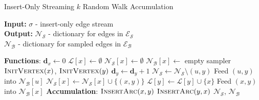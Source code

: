 \documentclass{report}
\newcommand{\algoname}[1]{\textnormal{\textsc{#1}}}
\begin{document}
\begin{algorithm}[htbp] 
\caption{Insert-Only Streaming $k$ Random Walk Accumulation}\label{alg:rw:serial:insert-only:accumulation}
\begin{flushleft}
        \textbf{Input:} 		$\sigma$ - insert-only edge stream\\
        \textbf{Output:} $\mathcal{N}_\mathcal{S}$ - dictionary for edges in $\mathcal{E}_\mathcal{S}$ \\
        	\hspace{4.05em}	$\mathcal{N}_\mathcal{B}$ - dictionary for sampled edges in $\mathcal{E}_\mathcal{B}$
\end{flushleft}
\begin{flushleft}
\begin{algorithmic}[1]
	\Statex \textbf{Functions}:
				\State $\mathbf{d}_x \gets 0$
				\State $\mathcal{L}[x] \gets \emptyset$			
				\State $\mathcal{N}_\mathcal{S}[x] \gets \emptyset$			
				\State $\mathcal{N}_\mathcal{B}[x] \gets$ empty sampler			
			\EndIf
		\EndFunction
			\State $\algoname{InitVertex}(x)$, $\algoname{InitVertex}(y)$
			\State $\mathbf{d}_y \gets \mathbf{d}_y + 1$
					\State $\mathcal{N}_\mathcal{S} \gets \mathcal{N}_\mathcal{S} \setminus (u, y)$
					\State Feed $(u,y)$ into $\mathcal{N}_\mathcal{B}[u]$
				\EndFor
			\EndIf
				\State $\mathcal{N}_\mathcal{S}[x] \gets \mathcal{N}_\mathcal{S}[x] \cup \{(x, y)\}$
				\State $\mathcal{L}[y] \gets \mathcal{L}[y] \cup \{x\}$
			\Else
				\State Feed $(x,y)$ into $\mathcal{N}_\mathcal{B}[x]$
			\EndIf
		\EndFunction
	\Statex \textbf{Accumulation}:
			\State $\algoname{InsertArc}(x, y)$
			\State $\algoname{InsertArc}(y, x)$
		\EndFor
		\State \Return $\mathcal{N}_\mathcal{S}$, $\mathcal{N}_\mathcal{B}$
\end{algorithmic}
\end{flushleft}
\end{algorithm}
\end{document}
